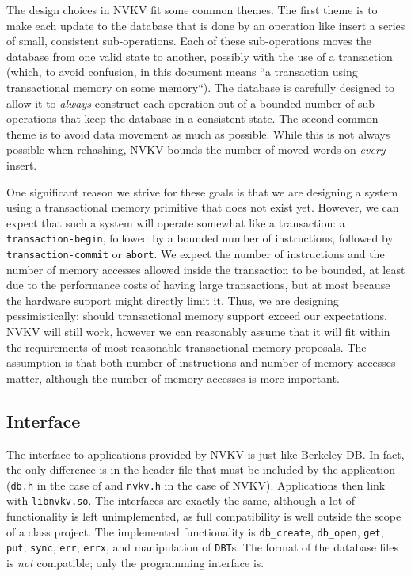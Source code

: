 The design choices in NVKV fit some common themes. The first theme is to make
each update to the database that is done by an operation like insert a series of
small, consistent sub-operations. Each of these sub-operations moves the
database from one valid state to another, possibly with the use of a transaction
(which, to avoid confusion, in this document means ``a transaction using
transactional memory on some memory``). The database is carefully designed to
allow it to \textit{always} construct each operation out of a bounded number of
sub-operations that keep the database in a consistent state. The second common
theme is to avoid data movement as much as possible. While this is not always
possible when rehashing, NVKV bounds the number of moved words on \textit{every}
insert.

One significant reason we strive for these goals is that we are designing a
system using a transactional memory primitive that does not exist yet. However,
we can expect that such a system will operate somewhat like a transaction: a
\texttt{transaction-begin}, followed by a bounded number of instructions,
followed by \texttt{transaction-commit} or \texttt{abort}. We expect the number
of instructions and the number of memory accesses allowed inside the transaction
to be bounded, at least due to the performance costs of having large
transactions, but at most because the hardware support might directly limit it.
Thus, we are designing pessimistically; should transactional memory support
exceed our expectations, NVKV will still work, however we can reasonably assume
that it will fit within the requirements of most reasonable transactional memory
proposals. The assumption is that both number of instructions and number of
memory accesses matter, although the number of memory accesses is more
important.

\subsection{Interface}

The interface to applications provided by NVKV is just like Berkeley DB. In
fact, the only difference is in the header file that must be included by the
application (\texttt{db.h} in the case of \bdb and \texttt{nvkv.h} in the case
of NVKV). Applications then link with \texttt{libnvkv.so}. The interfaces are
exactly the same, although a lot of functionality is left unimplemented, as full
compatibility is well outside the scope of a class project. The implemented
functionality is \texttt{db\_create}, \texttt{db\_open}, \texttt{get},
\texttt{put}, \texttt{sync}, \texttt{err}, \texttt{errx}, and manipulation of
\texttt{DBT}s. The format of the database files is \textit{not} compatible; only
the programming interface is.

